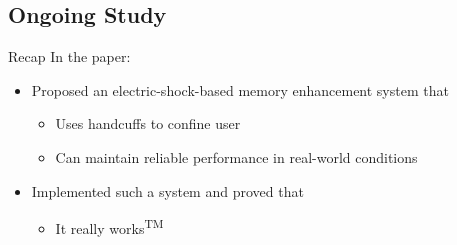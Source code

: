 \documentclass[10pt,aspectratio=43,mathserif]{beamer}
\begin{document}
\subsection{Ongoing Study}
\begin{frame}{Recap}  %
In the paper:
\begin{itemize}
\item Proposed an electric-shock-based memory enhancement system that
\begin{itemize}
\item Uses handcuffs to confine user
\item Can maintain reliable performance in real-world conditions
\end{itemize}
\item Implemented such a system and proved that
\begin{itemize}
\item It really works\textsuperscript{TM}
\end{itemize}
\end{itemize}
\end{frame}
\end{document}
